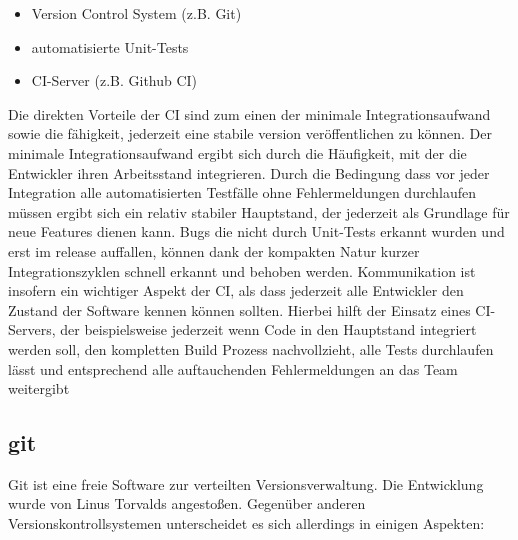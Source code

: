         \begin{itemize}
            \item Version Control System (z.B. Git)
            \item automatisierte Unit-Tests
            \item CI-Server (z.B. Github CI)
        \end{itemize}

    Die direkten Vorteile der CI sind zum einen der minimale Integrationsaufwand 
    sowie die fähigkeit, jederzeit eine stabile version veröffentlichen zu können. 
    Der minimale Integrationsaufwand ergibt sich durch die Häufigkeit, mit der die 
    Entwickler ihren Arbeitsstand integrieren. Durch die Bedingung dass vor jeder 
    Integration alle automatisierten Testfälle ohne Fehlermeldungen
    durchlaufen müssen ergibt sich ein relativ stabiler Hauptstand, der jederzeit 
    als Grundlage für neue Features dienen kann. Bugs die nicht durch Unit-Tests 
    erkannt wurden und erst im release auffallen, können dank der kompakten Natur 
    kurzer Integrationszyklen schnell erkannt und behoben werden. Kommunikation 
    ist insofern ein wichtiger Aspekt der CI, als dass jederzeit
    alle Entwickler den Zustand der Software kennen können sollten. Hierbei hilft 
    der Einsatz eines CI-Servers, der beispielsweise jederzeit wenn Code in den 
    Hauptstand integriert werden soll, den kompletten Build Prozess nachvollzieht, 
    alle Tests durchlaufen lässt und entsprechend alle auftauchenden 
    Fehlermeldungen an das Team weitergibt

    \subsection{git}
    Git ist eine freie Software zur verteilten Versionsverwaltung. Die Entwicklung 
    wurde von Linus Torvalds angestoßen. Gegenüber anderen 
    Versionskontrollsystemen unterscheidet es sich allerdings in einigen Aspekten:

